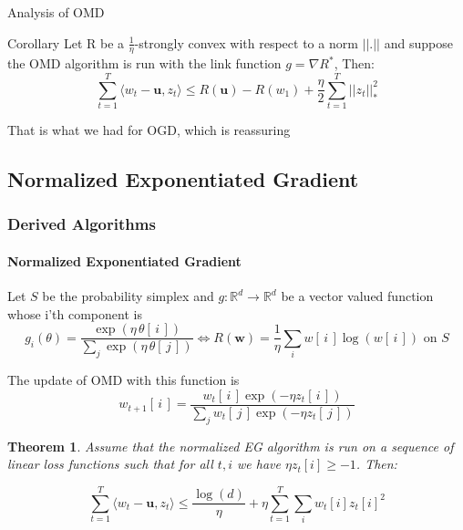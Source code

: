 \documentclass{beamer}
\newtheorem{thm}{Theorem}
\newcommand{\R}{\mathbb{R}}
\newcommand{\uu}{\mathbf{u}}
\newcommand{\w}{\mathbf{w}}
\begin{document}
\begin{frame}{Analysis of OMD}
\begin{block}{Corollary}
Let R be a $\frac{1}{\eta}$-strongly convex with respect to a norm $||.||$ and suppose the OMD algorithm is run with the link function $g= \nabla R^*$, Then:
$$\sum_{t=1}^T  \langle w_t-\uu , z_t \rangle \leq  R(\uu)-R(w_1)+   \frac{\eta}{2} \sum_{t=1}^T ||z_t||_*^2$$
\end{block}

That is what we had for OGD, which is reassuring

\end{frame}


\subsection{Normalized Exponentiated Gradient}
\begin{frame}
\frametitle{Derived Algorithms}
\framesubtitle{Normalized Exponentiated Gradient}
Let $S$ be the probability simplex and $g: \R^d \to \R^d$ be a vector valued function whose i'th component is 
$$g_i(\theta) = \frac{\exp(\eta\, \theta[\,i\,])}{\sum_j\exp(\eta \,\theta[\,j\,])}  \iff R(\w) = \frac{1}{\eta}\sum_{i} w[\,i\,] \log(w[\,i\,]) \text { on } S$$


The update of OMD with this function is 
$$w_{t+1}[
\,i\, ] = \frac{w_t[\, i\,] \exp(-\eta z_t[\, i\,])}{\sum_{j} w_t[\, j\,] \exp(-\eta z_t[\, j\,])}$$

\pause

\begin{thm}
Assume that the normalized EG algorithm is run on a sequence of linear loss functions such that for all $t, i$ we have $\eta z_t[i] \geq -1$.
Then:

\begin{equation}
\sum_{t=1}^T  \langle w_t-\uu , z_t \rangle \leq \frac{\log(d)}{\eta}  + \eta \sum_{t=1}^T \sum_i w_t[i] z_t[i]^2
\end{equation}

\end{thm}

\end{frame}
\end{document}
